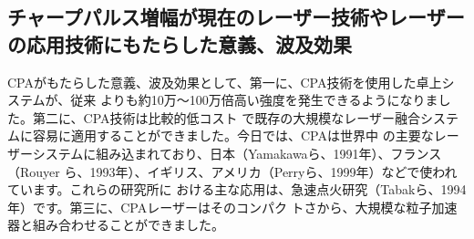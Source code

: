     \subsection{チャープパルス増幅が現在のレーザー技術やレーザーの応用技術にもたらした意義、波及効果}
      CPAがもたらした意義、波及効果として、第一に、CPA技術を使用した卓上システムが、従来
      よりも約10万〜100万倍高い強度を発生できるようになりました。第二に、CPA技術は比較的低コスト
      で既存の大規模なレーザー融合システムに容易に適用することができました。今日では、CPAは世界中
      の主要なレーザーシステムに組み込まれており、日本（Yamakawaら、1991年）、フランス（Rouyer
      ら、1993年）、イギリス、アメリカ（Perryら、1999年）などで使われています。これらの研究所に
      おける主な応用は、急速点火研究（Tabakら、1994年）です。第三に、CPAレーザーはそのコンパク
      トさから、大規模な粒子加速器と組み合わせることができました。\cite{ref. 01}
